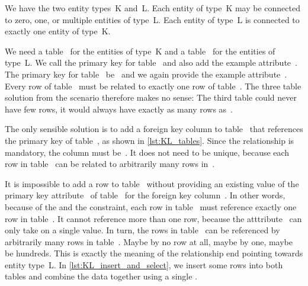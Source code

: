 %
%
\label{sec:rm:kl}%
%
%
%
%
We have the two entity types~K and~L.
Each entity of type~K may be connected to zero, one, or multiple entities of type~L.
Each entity of type~L is connected to exactly one entity of type~K.

We need a table~ for the entities of type~K and a table~ for the entities of type~L.
We call the primary key for table~  and also add the example attribute~.
The primary key for table~ be~ and we again provide the example attribute~.
Every row of table~ must be related to exactly one row of table~.
The three table solution from the  scenario therefore makes no sense:
The third table could never have few rows, it would always have exactly as many rows as~.

The only sensible solution is to add a foreign key column to table~ that references the primary key of table~, as shown in \cref{lst:KL_tables}.
Since the relationship is mandatory, the column must be~.
It does not need to be unique, because each row in table~ can be related to arbitrarily many rows in~.

It is impossible to add a row to table~ without providing an existing value of the primary key attribute~ of table~ for the foreign key column~.
In other words, because of the  and the  constraint, each row in table~ must reference exactly one row in table~.
It cannot reference more than one row, because the atttribute~ can only take on a single value.
In turn, the rows in table~ can be referenced by arbitrarily many rows in table~.
Maybe by no row at all, maybe by one, maybe be hundreds.
This is exactly the meaning of the  relationship end pointing towards entity type~L.
In \cref{lst:KL_insert_and_select}, we insert some rows into both tables and combine the data together using a single .%
%
\FloatBarrier%
\endhsection%
%
